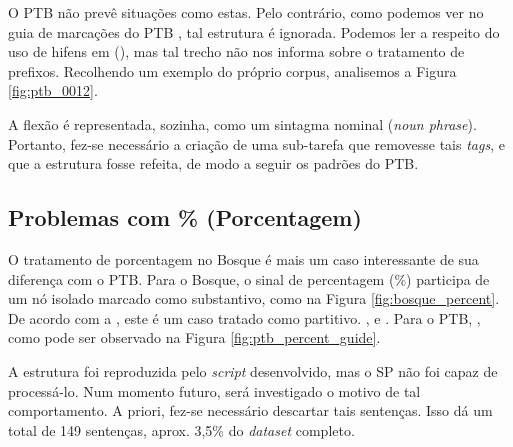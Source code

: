 \begin{center}
    
\end{center}

O PTB não prevê situações como estas. Pelo contrário, como podemos ver no guia de marcações do PTB \cite[p~315]{bracketing_ptb}, tal estrutura é ignorada. Podemos ler a respeito do uso de hifens em (\textit{}), mas tal trecho não nos informa sobre o tratamento de prefixos. Recolhendo um exemplo do próprio corpus, analisemos a Figura \ref{fig:ptb_0012}.

\begin{center}
    
\end{center}

A flexão  é representada, sozinha, como um sintagma nominal (\textit{noun phrase}). Portanto, fez-se necessário a criação de uma sub-tarefa que removesse tais \textit{tags}, e que a estrutura fosse refeita, de modo a seguir os padrões do PTB.

\subsection{Problemas com \% (Porcentagem)}
\label{subsec:percent}
O tratamento de porcentagem no Bosque é mais um caso interessante de sua diferença com o PTB.
Para o Bosque, o sinal de percentagem (\%) participa de um nó isolado marcado como substantivo, como na Figura \ref{fig:bosque_percent}. De acordo com a \cite[p~113-114]{afonso2006arvores}, este é um caso tratado como partitivo. , e . Para o PTB, , como pode ser observado na Figura \ref{fig:ptb_percent_guide}.
\begin{center}
    
\end{center}

A estrutura foi reproduzida pelo \textit{script} desenvolvido, mas o SP não foi capaz de processá-lo. Num momento futuro, será investigado o motivo de tal comportamento. A priori, fez-se necessário descartar tais sentenças. Isso dá um total de 149 sentenças, aprox. 3,5\% do \textit{dataset} completo.
\begin{center}
    
\end{center}
